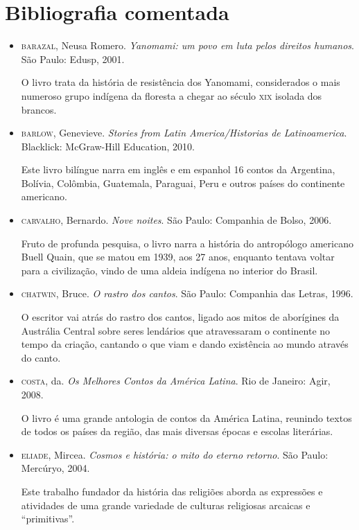 \documentclass[12pt]{extarticle}
\begin{document}
\section{Bibliografia comentada}

\begin{itemize}
\item \textsc{barazal}, Neusa Romero. \textit{Yanomami: um povo em luta pelos direitos
humanos}. São Paulo: Edusp, 2001.

O livro trata da história de resistência dos Yanomami, considerados
o mais numeroso grupo indígena da floresta a chegar ao século \textsc{xix} isolada
dos brancos.

\item \textsc{barlow}, Genevieve. \textit{Stories from Latin America/Historias de
Latinoamerica}. Blacklick: McGraw-Hill Education, 2010.

Este livro bilíngue narra em inglês e em espanhol 16 contos da
Argentina, Bolívia, Colômbia, Guatemala, Paraguai, Peru e outros países
do continente americano.

\item \textsc{carvalho}, Bernardo. \textit{Nove noites}. São Paulo: Companhia de Bolso,
2006.

Fruto de profunda pesquisa, o livro narra a história do antropólogo
americano Buell Quain, que se matou em 1939, aos 27 anos, enquanto
tentava voltar para a civilização, vindo de uma aldeia indígena no
interior do Brasil.

\item \textsc{chatwin}, Bruce. \textit{O rastro dos cantos}. São Paulo: Companhia das
Letras, 1996.

O escritor vai atrás do rastro dos cantos, ligado aos mitos de
aborígines da Austrália Central sobre seres lendários que atravessaram
o continente no tempo da criação, cantando o que viam e dando existência
ao mundo através do canto.

\item \textsc{costa}, da. \textit{Os Melhores Contos da América Latina}. Rio de Janeiro: Agir,
2008.

O livro é uma grande antologia de contos da América Latina, reunindo
textos de todos os países da região, das mais diversas épocas e escolas
literárias.

\item \textsc{eliade}, Mircea. \textit{Cosmos e história: o mito do eterno retorno}. São
Paulo: Mercúryo, 2004.

Este trabalho fundador da história das religiões aborda as expressões e
atividades de uma grande variedade de culturas religiosas arcaicas e
``primitivas''.


\end{itemize}
\end{document}
